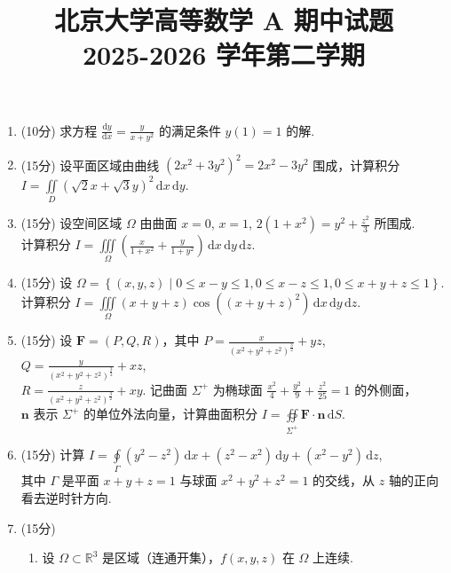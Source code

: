 \documentclass[11pt, a4paper]{article}
\title{\Large 北京大学高等数学 A 期中试题\\[0.5em]{\normalsize 2025-2026 学年第二学期}}
\author{}
\date{}
\begin{document}
\maketitle

 \begin{enumerate}
    \item (10分) 求方程 $\displaystyle \frac{\mathrm dy}{\mathrm dx} = \frac{y}{x+y^2}$ 的满足条件 $y(1)=1$ 的解.
    \item (15分) 设平面区域由曲线 $\left(2x^2+3y^2\right)^2=2x^2-3y^2$ 围成，计算积分 $\displaystyle I=\iint\limits_D \left(\sqrt{2}x+\sqrt{3}y\right)^2 \,\mathrm dx\,\mathrm dy$.
    \item (15分) 设空间区域 $\Omega$ 由曲面 $x=0$, $x=1$, $\displaystyle 2(1+x^2)=y^2+\frac{z^2}{3}$ 所围成. \\[0.6em]
        计算积分 $\displaystyle I=\iiint\limits_\Omega \left(\frac{x}{1+x^2}+\frac{y}{1+y^2}\right)\,\mathrm dx\,\mathrm dy\,\mathrm dz$.
    \item (15分) 设 $\Omega=\left\{(x,y,z) \;\Big|\; 0 \leq x-y \leq 1, 0 \leq x-z \leq 1, 0 \leq x+y+z \leq 1\right\}$. \\[0.6em]
        计算积分 $\displaystyle I=\iiint\limits_\Omega (x+y+z)\cos\left((x+y+z)^2\right) \,\mathrm dx\,\mathrm dy\,\mathrm dz$.
    \item (15分) 设 $\mathbf{F}=(P,Q,R)$，其中 $\displaystyle P=\frac{x}{(x^2+y^2+z^2)^{\frac{3}{2}}}+yz$, $\displaystyle Q=\frac{y}{(x^2+y^2+z^2)^{\frac{3}{2}}}+xz$, \\[0.6em]
        $\displaystyle R=\frac{z}{(x^2+y^2+z^2)^{\frac{3}{2}}}+xy$. 记曲面 $\Sigma^+$ 为椭球面 $\displaystyle \frac{x^2}{4}+\frac{y^2}{9}+\frac{z^2}{25}=1$ 的外侧面，\\[0.6em]
        $\mathbf{n}$ 表示 $\Sigma^+$ 的单位外法向量，计算曲面积分 $\displaystyle I=\oiint\limits_{\Sigma^+} \mathbf{F}\cdot\mathbf{n} \,\mathrm dS$.
    \item (15分) 计算 $\displaystyle I=\oint\limits_\Gamma \left(y^2-z^2\right)\,\mathrm dx+\left(z^2-x^2\right)\,\mathrm dy+\left(x^2-y^2\right)\,\mathrm dz$, \\[0.6em]
        其中 $\Gamma$ 是平面 $x+y+z=1$ 与球面 $x^2+y^2+z^2=1$ 的交线，从 $z$ 轴的正向看去逆时针方向.
    \item (15分) 
        \begin{enumerate}[label=(\arabic*)]
            \item 设 $\Omega \subset \mathbb{R}^3$ 是区域（连通开集），$f(x,y,z)$ 在 $\Omega$ 上连续. \\[0.8em]

\end{enumerate}
\end{enumerate}
\end{document}
